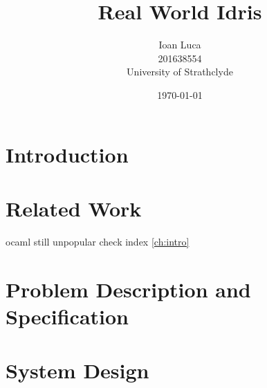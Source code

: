 \documentclass[a4paper, 12pt, oneside]{report} %
\title{Real World Idris}
\author{Ioan Luca \\ 201638554 \\ 
	\small University of Strathclyde} %
\date{\today}
\begin{document}






\tableofcontents


\chapter{Introduction}\label{ch:intro}


\chapter{Related Work}\label{ch:related}


ocaml still unpopular check index \autoref{ch:intro}

\chapter{Problem Description and Specification}\label{ch:spec}


\chapter{System Design}\label{ch:design}

\end{document}
